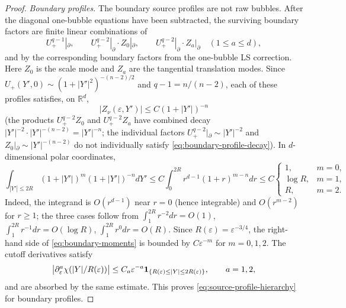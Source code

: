 \documentclass[11pt,reqno,a4paper]{amsart}
\numberwithin{equation}{section}
\theoremstyle{plain}
\theoremstyle{remark}
\theoremstyle{plain}
\begin{document}
\begin{proof}
\emph{Boundary profiles.}
The boundary source profiles are not raw bubbles.  After the diagonal one-bubble equations have been
subtracted, the surviving boundary factors are finite linear combinations of
\[
U_+^{q-1}|_\partial,\qquad
U_+^{q-2}|_\partial\cdot Z_0|_\partial,\qquad
U_+^{q-2}|_\partial\cdot Z_a|_\partial\quad(1\le a\le d),
\]
and by the corresponding boundary factors from the one-bubble LS correction.  Here $Z_0$ is the scale mode
and $Z_a$ are the tangential translation modes.  Since $U_+(Y',0)\sim(1+|Y'|^2)^{-(n-2)/2}$ and
$q-1=n/(n-2)$, each of these profiles satisfies, on $\mathbb R^d$,
\begin{equation}\label{eq:boundary-profile-decay}
|Z_\nu(\varepsilon,Y')|\le C(1+|Y'|)^{-n}
\end{equation}
(the products $U_+^{q-2}Z_0$ and $U_+^{q-2}Z_a$ have combined decay
$|Y'|^{-2}\cdot|Y'|^{-(n-2)}=|Y'|^{-n}$; the individual factors $U_+^{q-2}|_\partial\sim|Y'|^{-2}$ and
$Z_0|_\partial\sim|Y'|^{-(n-2)}$ do not individually satisfy \eqref{eq:boundary-profile-decay}).
In $d$-dimensional polar coordinates,
\begin{equation}\label{eq:boundary-moments}
\int_{|Y'|\le2R}(1+|Y'|)^m(1+|Y'|)^{-n}dY'
\le C\int_0^{2R}r^{d-1}(1+r)^{m-n}dr
\le
C\begin{cases}
1, & m=0,\\
\log R, & m=1,\\
R, & m=2.
\end{cases}
\end{equation}
Indeed, the integrand is $O(r^{d-1})$ near $r=0$ (hence integrable) and $O(r^{m-2})$ for $r\ge1$; the three
cases follow from $\int_1^{2R}r^{-2}dr=O(1)$, $\int_1^{2R}r^{-1}dr=O(\log R)$,
$\int_1^{2R}r^0dr=O(R)$.  Since $R(\varepsilon)=\varepsilon^{-3/4}$, the right-hand side of
\eqref{eq:boundary-moments} is bounded by $C\varepsilon^{-m}$ for $m=0,1,2$.  The cutoff derivatives satisfy
\begin{equation}\label{eq:cutoff-scale-derivatives}
\big|\partial_\varepsilon^a\chi(|Y|/R(\varepsilon))\big|
\le C_a\varepsilon^{-a}{\bf 1}_{\{R(\varepsilon)\le|Y|\le2R(\varepsilon)\}},
\qquad a=1,2,
\end{equation}
and are absorbed by the same estimate.  This proves \eqref{eq:source-profile-hierarchy} for boundary profiles.


\end{proof}
\end{document}
